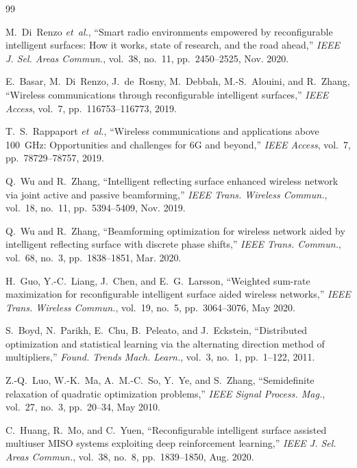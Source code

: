 \documentclass[conference]{IEEEtran}
\begin{document}
\begin{thebibliography}{99}
\footnotesize

M.~Di~Renzo \emph{et~al.}, ``Smart radio environments empowered by reconfigurable intelligent surfaces: How it works, state of research, and the road ahead,'' \emph{IEEE J. Sel. Areas Commun.}, vol.~38, no.~11, pp.~2450--2525, Nov. 2020.

E.~Basar, M.~Di~Renzo, J.~de~Rosny, M.~Debbah, M.-S.~Alouini, and R.~Zhang, ``Wireless communications through reconfigurable intelligent surfaces,'' \emph{IEEE Access}, vol.~7, pp.~116753--116773, 2019.

T.~S.~Rappaport \emph{et~al.}, ``Wireless communications and applications above 100~GHz: Opportunities and challenges for 6G and beyond,'' \emph{IEEE Access}, vol.~7, pp.~78729--78757, 2019.

Q.~Wu and R.~Zhang, ``Intelligent reflecting surface enhanced wireless network via joint active and passive beamforming,'' \emph{IEEE Trans. Wireless Commun.}, vol.~18, no.~11, pp.~5394--5409, Nov. 2019.

Q.~Wu and R.~Zhang, ``Beamforming optimization for wireless network aided by intelligent reflecting surface with discrete phase shifts,'' \emph{IEEE Trans. Commun.}, vol.~68, no.~3, pp.~1838--1851, Mar. 2020.

H.~Guo, Y.-C.~Liang, J.~Chen, and E.~G.~Larsson, ``Weighted sum-rate maximization for reconfigurable intelligent surface aided wireless networks,'' \emph{IEEE Trans. Wireless Commun.}, vol.~19, no.~5, pp.~3064--3076, May 2020.

S.~Boyd, N.~Parikh, E.~Chu, B.~Peleato, and J.~Eckstein, ``Distributed optimization and statistical learning via the alternating direction method of multipliers,'' \emph{Found. Trends Mach. Learn.}, vol.~3, no.~1, pp.~1--122, 2011.

Z.-Q.~Luo, W.-K.~Ma, A.~M.-C.~So, Y.~Ye, and S.~Zhang, ``Semidefinite relaxation of quadratic optimization problems,'' \emph{IEEE Signal Process. Mag.}, vol.~27, no.~3, pp.~20--34, May 2010.

C.~Huang, R.~Mo, and C.~Yuen, ``Reconfigurable intelligent surface assisted multiuser MISO systems exploiting deep reinforcement learning,'' \emph{IEEE J. Sel. Areas Commun.}, vol.~38, no.~8, pp.~1839--1850, Aug. 2020.


\end{thebibliography}
\end{document}

